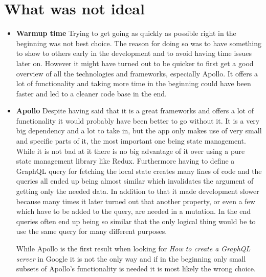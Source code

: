 \section{What was not ideal}
\begin{itemize}
\item \textbf{Warmup time} Trying to get going as quickly as possible right in the beginning was not best choice. The reason for doing so was to have something to show to others early in the development and to avoid having time issues later on. However it might have turned out to be quicker to first get a good overview of all the technologies and frameworks, especially Apollo. It offers a lot of functionality and taking more time in the beginning could have been faster and led to a cleaner code base in the end.

\item \textbf{Apollo} Despite having said that it is a great frameworks and offers a lot of functionality it would probably have been better to go without it. It is a very big dependency and a lot to take in, but the app only makes use of very small and specific parts of it, the most important one being state management. While it is not bad at it there is no big advantage of it over using a pure state management library like Redux. Furthermore having to define a GraphQL query for fetching the local state creates many lines of code and the queries all ended up being almost similar which invalidates the argument of getting only the needed data. In addition to that it made development slower because many times it later turned out that another property, or even a few which have to be added to the query, are needed in a mutation. In the end queries often end up being so similar that the only logical thing would be to use the same query for many different purposes.

While Apollo is the first result when looking for \emph{How to create a GraphQL server} in Google it is not the only way and if in the beginning only small subsets of Apollo's functionality is needed it is most likely the wrong choice.
\end{itemize}


